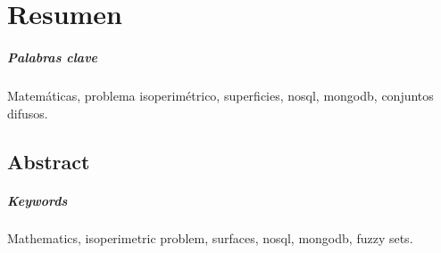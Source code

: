 
\chapter*{Resumen}


\paragraph{Palabras clave} Matemáticas, problema isoperimétrico, superficies, nosql, mongodb, conjuntos difusos.


\begin{otherlanguage}{american}
\chapter*{Abstract}


\paragraph{Keywords} Mathematics, isoperimetric problem, surfaces, nosql, mongodb, fuzzy sets.

\end{otherlanguage}
